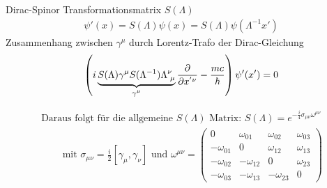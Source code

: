 




{\Huge
Dirac-Spinor Transformationsmatrix \(S(\Lambda)\)
\begin{align*}
 \psi'(x) = S(\Lambda)\psi(x) = S(\Lambda)\psi(\Lambda^{-1} x')
\end{align*}
Zusammenhang zwischen \(\gamma^\mu\) durch Lorentz-Trafo der Dirac-Gleichung
\begin{align*}
\left(i\underbr{S(\Lambda) \gamma^\mu S(\Lambda^{-1}) \Lambda^\nu_{\,\,\mu}}_{\gamma^\mu}\frac{\partial}{\partial x^{'\nu}} - \frac{mc}{\hbar}\right)\psi'(x') = 0
\end{align*}

\begin{align*}
\text{Daraus folgt für die allgemeine $S(\Lambda)$  Matrix: } \boxed{S(\Lambda) = e^{-\frac{i}{4}\sigma_{\mu\nu}\omega^{\mu\nu}}}
\end{align*}
\begin{align*}
\qquad \text{ mit }\sigma_{\mu\nu} = \frac{i}{2}[\gamma_\mu,\gamma_\nu] \text{ und } \omega^{\mu\nu} = \begin{pmatrix}0&\omega_{01}&\omega_{02}&\omega_{03}\\ -\omega_{01}&0&\omega_{12}&\omega_{13}\\-\omega_{02}&-\omega_{12}&0&\omega_{23}\\ -\omega_{03}&-\omega_{13}&-\omega_{23}&0\end{pmatrix}
\end{align*}


}%

